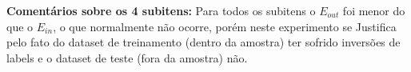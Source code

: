 \begin{enumerate}
\begin{enumerate}
        \textbf{Comentários sobre os 4 subitens:} Para todos os subitens o $E_{out}$ foi menor do que o $E_{in}$, o que normalmente não ocorre, porém neste experimento se Justifica pelo fato do dataset de treinamento (dentro da amostra) ter sofrido inversões de labels e o dataset de teste (fora da amostra) não. 

    \end{enumerate}

    
\end{enumerate}